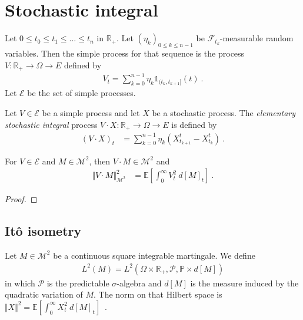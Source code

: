 \section{Stochastic integral}


\begin{definition}\label{def:simpleProcess}
Let $0 \le t_0 \le t_1 \le \ldots \le t_n$ in $\mathbb{R}_+$.
Let $(\eta_k)_{0 \le k \le n-1}$ be $\mathcal{F}_{t_k}$-measurable random variables.
Then the simple process for that sequence is the process $V : \mathbb{R}_+ \to \Omega \to E$ defined by
\begin{align*}
  V_t = \sum_{k=0}^{n-1} \eta_k \mathbb{1}_{(t_k, t_{k+1}]}(t)
  \: .
\end{align*}
Let $\mathcal{E}$ be the set of simple processes.
\end{definition}


\begin{definition}\label{def:elemStochIntegral}
Let $V \in \mathcal{E}$ be a simple process and let $X$ be a stochastic process.
The \emph{elementary stochastic integral} process $V \cdot X : \mathbb{R}_+ \to \Omega \to E$ is defined by
\begin{align*}
  (V \cdot X)_t
  &= \sum_{k=0}^{n-1} \eta_k (X^t_{t_{k+1}} - X^t_{t_k})
  \: .
\end{align*}
\end{definition}


\begin{lemma}\label{lem:sq_norm_elemStochIntegral}
For $V \in \mathcal{E}$ and $M \in \mathcal{M}^2$, then $V \cdot M \in \mathcal{M}^2$ and
\begin{align*}
  \Vert V \cdot M \Vert_{\mathcal{M}^2}^2
  &= \mathbb{E}\left[ \int_0^{\infty} V_t^2 \: d[M]_t \right]
  \: .
\end{align*}
\end{lemma}

\begin{proof}

\end{proof}


\subsection{Itô isometry}

\begin{definition}\label{def:L2M}
Let $M \in \mathcal{M}^2$ be a continuous square integrable martingale. We define
\begin{align*}
  L^2(M) = L^2(\Omega \times \mathbb{R}_+, \mathcal{P}, \mathbb{P} \times d[M])
\end{align*}
in which $\mathcal{P}$ is the predictable $\sigma$-algebra and $d[M]$ is the measure induced by the quadratic variation of $M$.
The norm on that Hilbert space is $\Vert X \Vert^2 = \mathbb{E}\left[ \int_0^{\infty} X_t^2 \: d[M]_t \right]$~.
\end{definition}

